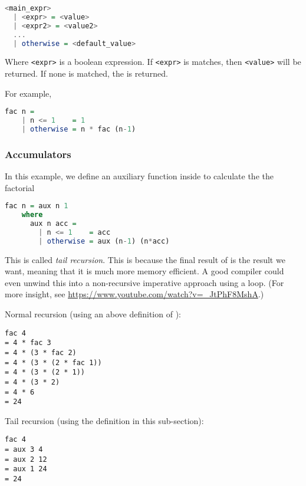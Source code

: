 \begin{lstlisting}[language=haskell]
<main_expr>
  | <expr> = <value>
  | <expr2> = <value2>
  ...
  | otherwise = <default_value>
\end{lstlisting}
Where \texttt{<expr>} is a boolean expression. If \texttt{<expr>} is matches, then \texttt{<value>} will be returned. If none is matched, the \texttt{} is returned.

For example,

\begin{lstlisting}[language=haskell]
  fac n =
    | n <= 1    = 1
    | otherwise = n * fac (n-1)
\end{lstlisting}

\subsubsection{Accumulators}
In this example, we define an auxiliary function \texttt{} inside \texttt{} to calculate the the factorial

\begin{lstlisting}[language=haskell]
  fac n = aux n 1
    where
      aux n acc =
        | n <= 1    = acc
        | otherwise = aux (n-1) (n*acc)
\end{lstlisting}

This is called \textit{tail recursion}. This is because the final result of \texttt{} is the result we want, meaning that it is much more memory efficient. A good compiler could even unwind this into a non-recursive imperative approach using a loop. (For more insight, see \url{https://www.youtube.com/watch?v=_JtPhF8MshA}.)

Normal recursion (using an above definition of \texttt{}):
\begin{verbatim}
fac 4
= 4 * fac 3
= 4 * (3 * fac 2)
= 4 * (3 * (2 * fac 1))
= 4 * (3 * (2 * 1))
= 4 * (3 * 2)
= 4 * 6
= 24
\end{verbatim}

Tail recursion (using the definition in this sub-section):
\begin{verbatim}
fac 4
= aux 3 4
= aux 2 12
= aux 1 24
= 24
\end{verbatim}